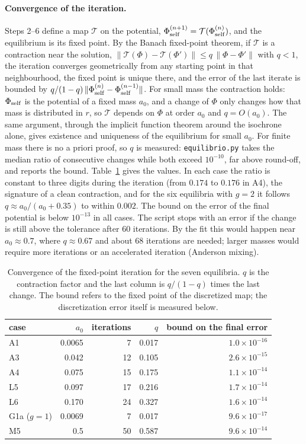 \documentclass[11pt,a4paper]{article}
\begin{document}
\paragraph{Convergence of the iteration.} Steps 2--6 define a map $\mathcal T$ on the
potential, $\Phi_{\rm self}^{(n+1)}=\mathcal T(\Phi_{\rm self}^{(n)})$, and the equilibrium is its fixed
point. By the Banach fixed-point theorem, if $\mathcal T$ is a contraction near the solution,
$\|\mathcal T(\Phi)-\mathcal T(\Phi')\|\le q\,\|\Phi-\Phi'\|$ with $q<1$, the iteration converges
geometrically from any starting point in that neighbourhood, the fixed point is unique
there, and the error of the last iterate is bounded by
$q/(1-q)\,\|\Phi_{\rm self}^{(n)}-\Phi_{\rm self}^{(n-1)}\|$. For small mass the contraction holds:
$\Phi_{\rm self}$ is the potential of a fixed mass $a_0$, and a change of $\Phi$ only changes
how that mass is distributed in $r$, so $\mathcal T$ depends on $\Phi$ at order $a_0$ and
$q=O(a_0)$. The same argument, through the implicit function theorem around the
isochrone alone, gives existence and uniqueness of the equilibrium for small $a_0$. For
finite mass there is no a priori proof, so $q$ is measured: \texttt{equilibrio.py} takes the
median ratio of consecutive changes while both exceed $10^{-10}$, far above round-off, and
reports the bound. Table~\ref{tab:q} gives the values. In each case the ratio is constant
to three digits during the iteration (from $0.174$ to $0.176$ in A4), the signature of a
clean contraction, and for the six equilibria with $g=2$ it follows
$q\approx a_0/(a_0+0.35)$ to within $0.002$. The bound on the error of the final potential is
below $10^{-13}$ in all cases. The script stops with an error if the change is still above
the tolerance after 60 iterations. By the fit this would happen near $a_0\approx0.7$, where
$q\approx0.67$ and about 68 iterations are needed; larger masses would require more
iterations or an accelerated iteration (Anderson mixing).

\begin{table}[!htbp]
\centering
\small
\begin{tabular}{lrrrr}
\toprule
case & $a_0$ & iterations & $q$ & bound on the final error\\
\midrule
A1 & 0.0065 & 7 & 0.017 & $1.0\times10^{-16}$\\
A3 & 0.042 & 12 & 0.105 & $2.6\times10^{-15}$\\
A4 & 0.075 & 15 & 0.175 & $1.1\times10^{-14}$\\
L5 & 0.097 & 17 & 0.216 & $1.7\times10^{-14}$\\
L6 & 0.170 & 24 & 0.327 & $1.6\times10^{-14}$\\
G1a ($g=1$) & 0.0069 & 7 & 0.017 & $9.6\times10^{-17}$\\
M5 & 0.5 & 50 & 0.587 & $9.6\times10^{-14}$\\
\bottomrule
\end{tabular}
\caption{Convergence of the fixed-point iteration for the seven equilibria. $q$ is the
contraction factor and the last column is $q/(1-q)$ times the last change. The bound
refers to the fixed point of the discretized map; the discretization error itself is
measured below.}
\label{tab:q}
\end{table}
\end{document}

